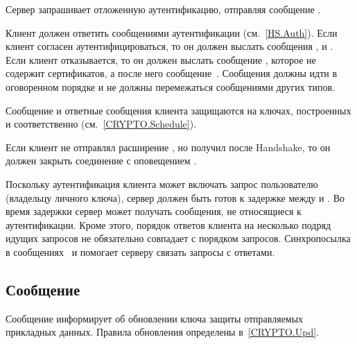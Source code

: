 
Сервер запрашивает отложенную аутентификацию, отправляя сообщение 
. 

Клиент должен ответить сообщениями аутентификации (см.~\ref{HS.Auth}). 
%
Если клиент согласен аутентифицироваться, то он должен выслать сообщения
,  и 
. 
%
Если клиент отказывается, то он должен выслать сообщение 
, которое не содержит сертификатов,
а после него сообщение~. 
%
Сообщения должны идти в оговоренном порядке и не должны перемежаться 
сообщениями других типов.

Сообщение  и ответные сообщения клиента
защищаются на ключах, построенных 
и  соответственно
(см.~\ref{CRYPTO.Schedule}). 

Если клиент не отправлял расширение ,
но получил  после Handshake, то он должен 
закрыть соединение с оповещением .

Поскольку аутентификация клиента может включать запрос пользователю (владельцу 
личного ключа), сервер должен быть готов к задержке между 
 и .
Во время задержки сервер может получать сообщения, не относящиеся к 
аутентификации.
%
Кроме этого, порядок ответов клиента на несколько подряд идущих запросов 
 не обязательно совпадает с порядком запросов.
%
Синхропосылка  в 
сообщениях~ и    
помогает серверу связать запросы с ответами.


\subsection{Сообщение }\label{HS.KU} 

Сообщение  информирует об обновлении ключа защиты 
отправляемых прикладных данных. Правила обновления определены 
в~\ref{CRYPTO.Upd}. 

